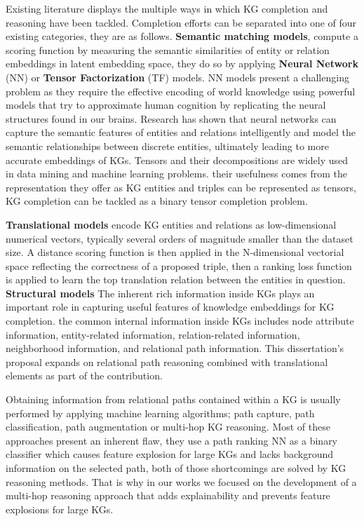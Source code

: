 Existing literature displays the multiple ways in which KG completion and reasoning have been tackled. Completion efforts can be separated into one of four existing categories\cite{shen2022comprehensive}, they are as follows.
\textbf{Semantic matching models}, compute a scoring function by measuring the semantic similarities of entity or relation embeddings in latent embedding space, they do so by applying \textbf{Neural Network} (NN) or \textbf{Tensor Factorization} (TF) models. 
NN models \cite{} present a challenging problem as they require the effective encoding of world knowledge using powerful models that try to approximate human cognition by replicating the neural structures found in our brains. Research has shown that neural networks can capture the semantic features of entities and relations intelligently and model the semantic relationships between discrete entities, ultimately leading to more accurate embeddings of KGs.
Tensors\cite{} and their decompositions are widely used in data mining and machine learning problems. their usefulness comes from the representation they offer as KG entities and triples can be represented as tensors, KG completion can be tackled as a binary tensor completion problem\cite{shen2022comprehensive}.

\textbf{Translational models}\cite{} encode KG entities and relations as low-dimensional numerical vectors, typically several orders of magnitude smaller than the dataset size. A distance scoring function is then applied in the N-dimensional vectorial space reflecting the correctness of a proposed triple, then a ranking loss function is applied to learn the top translation relation between the entities in question.
\textbf{Structural models}\cite{} The inherent rich information inside KGs plays an important role in capturing useful features of knowledge embeddings for KG completion. the common internal information inside KGs includes node attribute information\cite{}, entity-related information\cite{}, relation-related information\cite{}, neighborhood information\cite{}, and relational path information\cite{}. This dissertation's proposal expands on relational path reasoning combined with translational elements as part of the contribution.


Obtaining information from relational paths contained within a KG is usually performed by applying machine learning algorithms; path capture\cite{}, path classification\cite{}, path augmentation\cite{} or multi-hop KG reasoning\cite{}. Most of these approaches present an inherent flaw, they use a path ranking NN as a binary classifier which causes feature explosion for large KGs and lacks background information on the selected path, both of those shortcomings are solved by KG reasoning methods. That is why in our works we focused on the development of a multi-hop reasoning approach that adds explainability and prevents feature explosions for large KGs.

